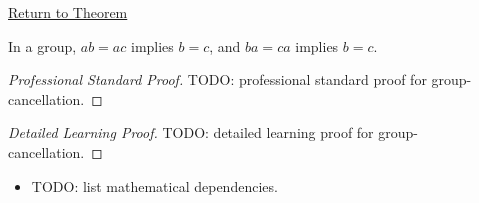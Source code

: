 \newpage
{}
\label{prf:group-cancellation}

\begin{remark*}[Return]
\hyperref[prop:group-cancellation]{Return to Theorem}
\end{remark*}

\begin{proposition*}
In a group, $ab=ac$ implies $b=c$, and $ba=ca$ implies $b=c$.
\end{proposition*}

\begin{proof}[Professional Standard Proof]
\LRAProofBodyStart
TODO: professional standard proof for group-cancellation.
\end{proof}

\begin{proof}[Detailed Learning Proof]
\LRAProofBodyStart
TODO: detailed learning proof for group-cancellation.
\end{proof}

\begin{remark*}
\end{remark*}

\begin{dependencies}
\begin{itemize}
  \item TODO: list mathematical dependencies.
\end{itemize}
\end{dependencies}

\clearpage

